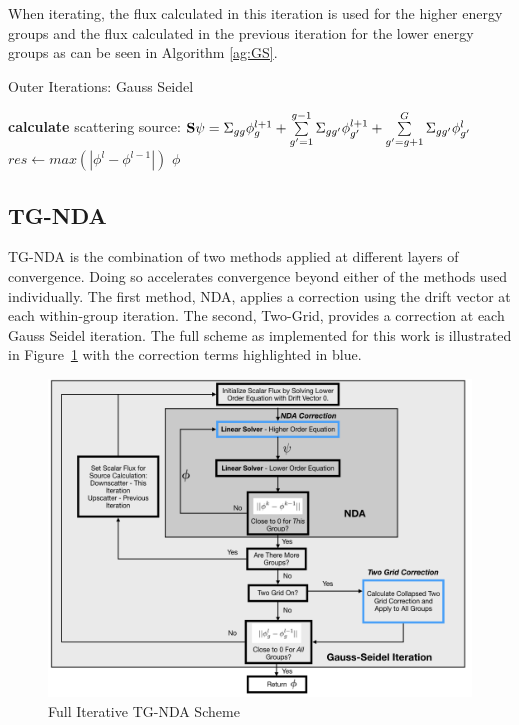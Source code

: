 When iterating, the flux calculated in this iteration is used for the higher energy groups and the flux calculated in the previous iteration for the lower energy groups as can be seen in Algorithm \ref{ag:GS}.
\begin{algorithm}
\caption{Outer Iterations: Gauss Seidel}
\begin{algorithmic}
     
            \State \textbf{calculate} scattering source: \State $ {\bf S} \psi = \Sigma_{gg}\phi_g^{l+1} + \sum\limits_{g'=1}^{g-1} \Sigma_{gg'} \phi_{g'}^{l+1} + \sum\limits_{g'=g+1}^G \Sigma_{gg'}\phi_{g'}^l$
        \EndProcedure
        \EndFor
        \State $res \gets max(|\phi^{l} - \phi^{l-1}|)$  
        \EndWhile
    \Return $\phi$
\end{algorithmic}
\label{ag:GS}
\end{algorithm}

\subsection{TG-NDA}
TG-NDA is the combination of two methods applied at different layers of convergence. Doing so accelerates convergence beyond either of the methods used individually. The first method, NDA, applies a correction using the drift vector at each within-group iteration. The second, Two-Grid, provides a correction at each Gauss Seidel iteration. The full scheme as implemented for this work is illustrated in Figure~\ref{fig:tgnda-graph} with the correction terms highlighted in blue. 

\begin{figure}[H]
    \centering
    \includegraphics[width=\textwidth]{fig/TGNDAchart.png}
    \caption{Full Iterative TG-NDA Scheme}
    \label{fig:tgnda-graph}
\end{figure}